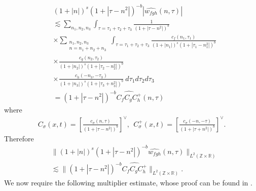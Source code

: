 \documentclass[12pt,reqno]{amsart}
\numberwithin{equation}{section}  %
\numberwithin{figure}{section}
\newcommand{\rr}{\mathbb{R}}
\newcommand{\zz}{\mathbb{Z}}
\newcommand{\wh}{\widehat}
\theoremstyle{plain}
\theoremstyle{definition}
\theoremstyle{remark}
\begin{document}
\begin{equation*}
	\begin{split}
		& \left (1 + |n| \right )^s \left( 1 +  | \tau - n^2  | \right)^{-b} | 
		\wh{w_{fgh}}\left( n, \tau \right) | 
		\\
		& \lesssim \sum_{n_1, n_2,n_3} \int_{\tau=\tau_1 + \tau_2 + \tau_3} \frac{1}{\left( 1 +
		| \tau - n^2| 
		\right)^{b}}  
		\\
		& \times
		\sum_{\substack{n_1,n_2,n_3\\n = n_1 + n_2 + n_3}} \int_{\tau=\tau_1 + \tau_2 + \tau_3} \frac{c_f\left( n_1, \tau_1 
		\right)}{\left (1 + |n_1| \right )^s \left( 1 + | \tau_1 - n_1^2 |
		\right)^{b}}
		\\
		& \times \frac{c_{g}\left( n_2, \tau_2 \right)}{\left (1 + |n_2| \right ) 
		^s\left( 1 + | \tau_2 -  n_2^2| 
		\right)^{b}}
		\\
		& \times \frac{c_{h}\left( -n_3, -\tau_3 \right)}{\left (1 + |n_3| \right ) ^s\left( 1 + | 
		\tau_3 + n_3^2 | \right)^{b}} \ d \tau_1 d \tau_2 d \tau_3
		\\
		& = \left( 1 + | \tau - n^2 | \right)^{-b}
		\wh{C_f C_{g} C^+_{h}} \left( n, \tau \right)
	\end{split}
\end{equation*}
%
%
where
%
%
\begin{equation*}
	\begin{split}
		C_\sigma(x, t) = \left[ \frac{c_\sigma\left( n, \tau \right)}{\left( 
		1 + | \tau - n^2 | \right)^{b}} \right]^\vee,
		\ \ C^+_\sigma(x, t) = \left[ \frac{c_\sigma\left( -n, -\tau \right)}{\left( 
		1 + | \tau + n^2 | \right)^{b}} \right]^\vee.
	\end{split}
\end{equation*}
%
%
Therefore
%
%
\begin{equation}
	\label{gen-holder-pre-estimate}
	\begin{split}
		& \| \left( 1 + |n | \right)^s
		\left( 1 + | \tau - n^2 | \right)^{-b} \wh{w_{fgh}}(n, 
		\tau)		
		\|_{L^2(\zz \times \rr)}
		\\
		& \lesssim \| \left( 1 + | \tau - n^2 | \right)^{-b}
		\wh{C_f C_{g} C^+_{h}} \|_{L^2(\zz \times \rr)}.
	\end{split}
\end{equation}
%
We now require the following multiplier estimate, whose proof can be found in 
\cite{Himonas-Misiolek-2001-A-priori-estimates-for-Schrodinger}.
%
%
%
%
%
%
\end{document}
